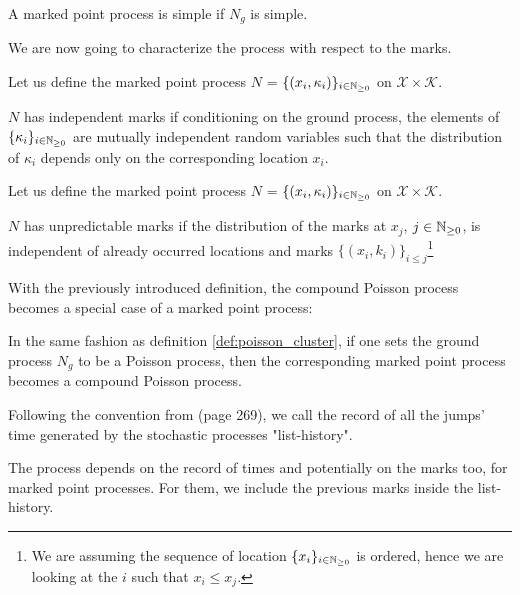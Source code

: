 \documentclass[11pt]{book}
\newcommand{\sequence}[1]{\{ #1 \}_{ i \in \N} }
\begin{document}
\begin{definition}
A marked point process is simple if $N_g$ is simple.
\end{definition}

We are now going to characterize the process with respect to the marks. 

\begin{definition}
Let us define the marked point process $N$  = $\sequence{ (x_i, \kappa_i) }$ on $\mathcal X \times \mathcal K$. 

$N$ has independent marks if conditioning on the ground process, the elements of $\sequence{ \kappa_i }$ are mutually independent random variables such that the distribution of $\kappa_i$  depends only on the corresponding location $x_i$. 
\end{definition}


\begin{definition}
Let us define the marked point process $N$  = $\sequence{ (x_i, \kappa_i) }$ on $\mathcal X \times \mathcal K$. 

$N$ has unpredictable marks if the distribution of the marks at $x_j$, $j \in \mathbb{N}_{\geq 0}$, is independent of already occurred locations and marks $\{ (x_i, k_i) \}_{i \leq j}$\footnote{We are assuming the sequence of location $\sequence{x_i}$ is ordered, hence we are looking at the $i$ such that $x_i \leq x_j$.}
\end{definition}


With the previously introduced definition, the compound Poisson process becomes a special case of a marked point process:

\begin{definition}
In the same fashion as definition \ref{def:poisson_cluster}, if one sets the ground process $N_g$ to be a Poisson process, then the corresponding marked point process becomes a compound Poisson process.
\end{definition}



Following the convention from \cite{daley} (page 269), we call the record of all the jumps' time generated by the stochastic processes "list-history". 

The process depends on the record of times and potentially on the marks too, for marked point processes. For them, we include the previous marks inside the list-history.
\end{document}
